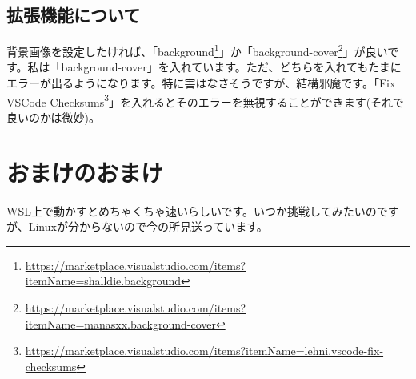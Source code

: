 \subsection{拡張機能について}
背景画像を設定したければ、「background\footnote{\url{https://marketplace.visualstudio.com/items?itemName=shalldie.background}}」か「background-cover\footnote{\url{https://marketplace.visualstudio.com/items?itemName=manasxx.background-cover}}」が良いです。私は「background-cover」を入れています。ただ、どちらを入れてもたまにエラーが出るようになります。特に害はなさそうですが、結構邪魔です。「Fix VSCode Checksums\footnote{\url{https://marketplace.visualstudio.com/items?itemName=lehni.vscode-fix-checksums}}」を入れるとそのエラーを無視することができます(それで良いのかは微妙)。

\section{おまけのおまけ}
WSL上で動かすとめちゃくちゃ速いらしいです。いつか挑戦してみたいのですが、Linuxが分からないので今の所見送っています。




